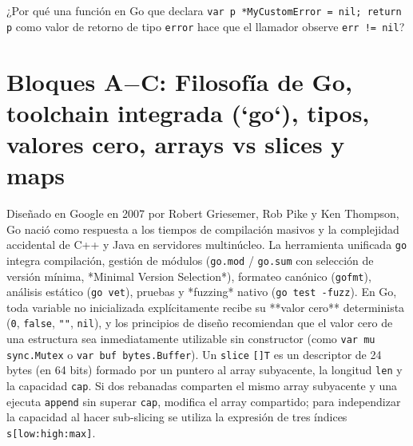 \documentclass{book}
\begin{document}
\begin{tcolorbox}[title={Autoficha}, studiumcheck, breakable]

¿Por qué una función en Go que declara \texttt{var p *MyCustomError = nil; return p} como valor de retorno de tipo \texttt{error} hace que el llamador observe \texttt{err != nil}?
\end{tcolorbox}

\section{Bloques A\(-\)C: Filosofía de Go, toolchain integrada (`go`), tipos, valores cero, arrays vs slices y maps}

Diseñado en Google en 2007 por Robert Griesemer, Rob Pike y Ken Thompson, Go nació como respuesta a los tiempos de compilación masivos y la complejidad accidental de C++ y Java en servidores multinúcleo. La herramienta unificada \texttt{go} integra compilación, gestión de módulos (\texttt{go.mod} / \texttt{go.sum} con selección de versión mínima, *Minimal Version Selection*), formateo canónico (\texttt{gofmt}), análisis estático (\texttt{go vet}), pruebas y *fuzzing* nativo (\texttt{go test -fuzz}). En Go, toda variable no inicializada explícitamente recibe su **valor cero** determinista (\texttt{0}, \texttt{false}, \texttt{""}, \texttt{nil}), y los principios de diseño recomiendan que el valor cero de una estructura sea inmediatamente utilizable sin constructor (como \texttt{var mu sync.Mutex} o \texttt{var buf bytes.Buffer}). Un \texttt{slice} \texttt{[]T} es un descriptor de 24 bytes (en 64 bits) formado por un puntero al array subyacente, la longitud \texttt{len} y la capacidad \texttt{cap}. Si dos rebanadas comparten el mismo array subyacente y una ejecuta \texttt{append} sin superar \texttt{cap}, modifica el array compartido; para independizar la capacidad al hacer sub-slicing se utiliza la expresión de tres índices \texttt{s[low:high:max]}.
\end{document}
